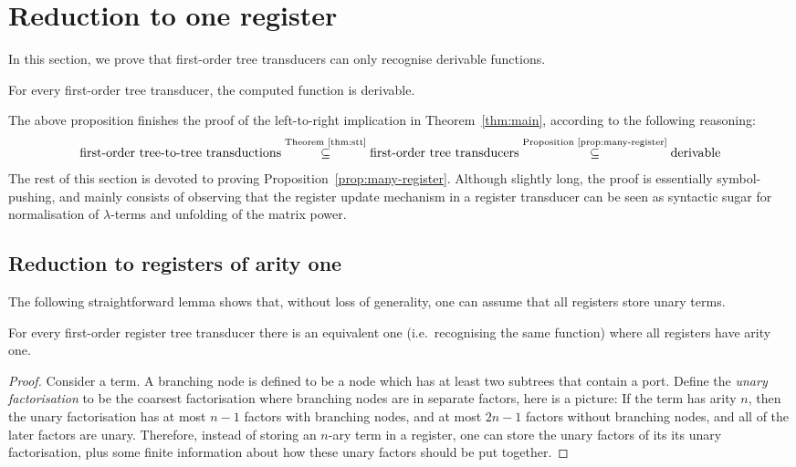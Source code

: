 \section{Reduction to one register}
\label{sec:matrix-power}
In this section, we prove that first-order  tree transducers can only recognise derivable functions. 
\begin{proposition}
    \label{prop:many-register} 
For every first-order  tree transducer, the computed function is derivable. 
\end{proposition}

The above proposition finishes the proof of the left-to-right implication in Theorem~\ref{thm:main}, according to the following reasoning:
\begin{align*}
\text{first-order tree-to-tree transductions}  \stackrel {\text{Theorem~\ref{thm:stt}}}\subseteq  \text{first-order tree transducers} \stackrel {\text{Proposition~\ref{prop:many-register}}} \subseteq \text{derivable}
\end{align*}
The rest of this section is devoted to proving Proposition~\ref{prop:many-register}. Although slightly long, the proof is essentially symbol-pushing, and mainly consists of observing that the register update mechanism in a register transducer can be seen as syntactic sugar for normalisation of $\lambda$-terms and unfolding of the matrix power. 

\newcommand{\regup}[2]{\ranked{\mathsf{U}_{#2}#1}}


\subsection{Reduction to registers of arity one}
The following straightforward lemma shows that, without loss of generality, one can assume that all registers store unary terms. 
\begin{lemma}\label{lem:unary-registers}
    For every first-order register tree transducer there is an equivalent one (i.e.~recognising the same function) where all registers have arity one. 
\end{lemma}
\begin{proof}
    Consider a term. A branching node is defined to be a node which has at least two subtrees that contain a port. Define the  \emph{unary factorisation} to be the coarsest factorisation where branching nodes are in separate factors, here is a picture:
    If the term has arity $n$, then the unary factorisation has at most $n-1$ factors with branching nodes, and at most $2n-1$ factors without branching nodes, and all of the later factors are unary. Therefore, instead of storing an $n$-ary term in a register, one can store the unary factors of its its unary factorisation, plus some finite information about how these unary factors should be put together. 
\end{proof}

